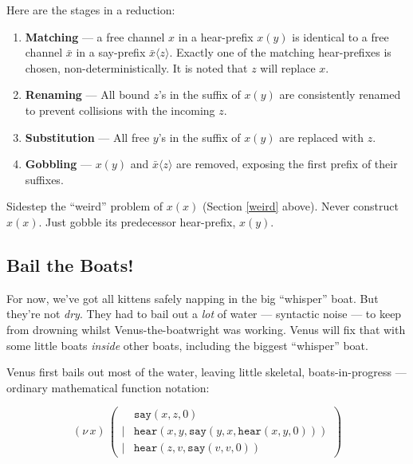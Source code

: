 \documentclass[10pt,oneside,x11names]{article}
\newcommand\napping    [0]{0}
\newcommand\whispering [2]{(\nu\,#1)\,{#2}}
\theoremstyle{definition}
\theoremstyle{warning}
\begin{document}
Here are the stages in a reduction:

\begin{enumerate}
\item \textbf{Matching} --- a free channel \(x\) in a hear-prefix
\(x(y)\) is identical to a free channel \(\bar{x}\) in a say-prefix
\(\bar{x}\langle{z}\rangle\). Exactly one of the matching
hear-prefixes is chosen, non-deterministically. It is noted
that \(z\) will replace \(x\).

\item \textbf{Renaming} --- All bound \(z\)'s in the suffix of
\(x(y)\) are consistently renamed to prevent collisions with
the incoming \(z\).

\item \textbf{Substitution} --- All free \(y\)'s in the suffix of
\(x(y)\) are replaced with \(z\).

\item \textbf{Gobbling} --- \(x(y)\) and \(\bar{x}\langle{z}\rangle\)
are removed, exposing the first prefix of their suffixes.
\end{enumerate}

Sidestep the ``weird'' problem of \(x(x)\) (Section \ref{weird} above).
Never construct \(x(x)\). Just gobble its predecessor hear-prefix,
\(x(y)\).

\subsection{Bail the Boats!}
\label{sec:org8ea2887}

For now, we've got all kittens safely napping in the big
``whisper'' boat. But they're not \emph{dry}. They had to bail out a
\emph{lot} of water --- syntactic noise --- to keep from drowning
whilst Venus-the-boatwright was working. Venus will fix that
with some little boats \emph{inside} other boats, including the
biggest ``whisper'' boat.

Venus first bails out most of the water, leaving little skeletal,
boats-in-progress --- ordinary mathematical function notation:

\begin{equation}
\whispering{x}{\left(
\begin{array}{clll}
 {}     & \texttt{say} (x, z, \napping) \\
 \vert  & \texttt{hear}(x, y, \texttt{say}(y, x, \texttt{hear}(x, y, \napping))) \\
 \vert  & \texttt{hear}(z, v, \texttt{say}(v, v, \napping))
\end{array}\right)}
\end{equation}
\end{document}
